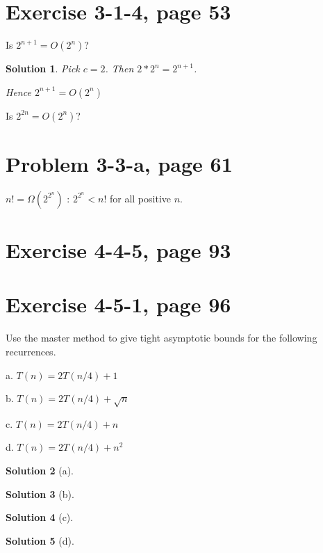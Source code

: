 \documentclass[letterpaper, 11pt]{article}
\theoremstyle{mystyle}
\newtheorem*{sln}{Solution}
\begin{document}
\section{Exercise 3-1-4, page 53}
Is $2^{n+1} = O(2^n)$? 

\begin{sln}
    Pick $c=2$. Then $2 * 2^n = 2^{n+1}$. 

    Hence $2^{n+1} = O(2^n)$
\end{sln}

Is $2^{2n} = O(2^n)$?


\section{Problem 3-3-a, page 61}

\begin{compactitem} 
    \item $n! = \Omega(2^{2^n})$ : $2^{2^n} < n!$ for all positive $n$. 

\end{compactitem}


\section{Exercise 4-4-5, page 93}


\section{Exercise 4-5-1, page 96}
Use the master method to give tight asymptotic bounds for the following recurrences.
\begin{compactitem}
    \item a. $T(n) = 2T(n/4) + 1$
    \item b. $T(n) = 2T(n/4) + \sqrt{n}$
    \item c. $T(n) = 2T(n/4) + n$
    \item d. $T(n) = 2T(n/4) + n^2$
\end{compactitem}

\begin{sln}[a]
\end{sln}

\begin{sln}[b]
\end{sln}

\begin{sln}[c]
\end{sln}

\begin{sln}[d]
\end{sln}
\end{document}
